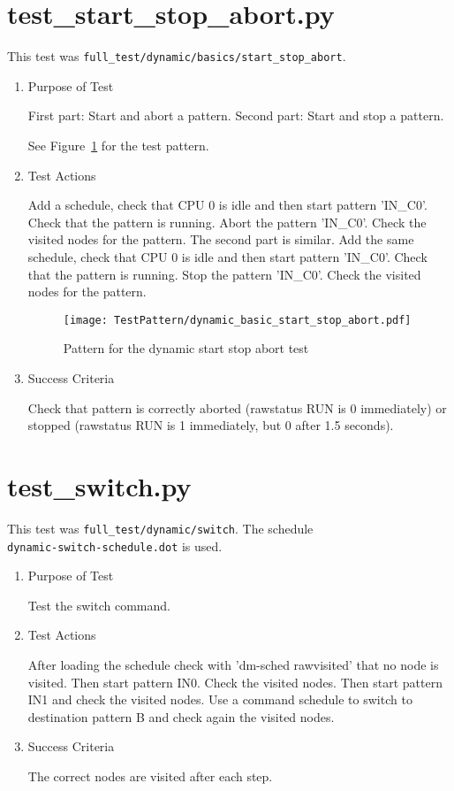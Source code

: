 \documentclass[12pt,a4paper]{report}
\begin{document}
\section{test\_start\_stop\_abort.py}
This test was \texttt{full\_test/dynamic/basics/start\_stop\_abort}.
\begin{enumerate}
  \item Purpose of Test

    First part: Start and abort a pattern. Second part: Start and stop a pattern.

  See Figure~\ref{fig:Pattern_for_the_dynamic_start_stop_abort_test} for the test pattern.
  \item Test Actions

    Add a schedule, check that CPU 0 is idle and then start pattern 'IN\_C0'. Check that the pattern is running.
    Abort the pattern 'IN\_C0'. Check the visited nodes for the pattern. The second part is similar.
    Add the same schedule, check that CPU 0 is idle and then start pattern 'IN\_C0'. Check that the pattern is running.
    Stop the pattern 'IN\_C0'. Check the visited nodes for the pattern.
    \begin{figure}
        \centering
        \texttt{[image: TestPattern/dynamic\_basic\_start\_stop\_abort.pdf]}
        \caption{Pattern for the dynamic start stop abort test}
        \label{fig:Pattern_for_the_dynamic_start_stop_abort_test}
    \end{figure}
  \item Success Criteria

  Check that pattern is correctly aborted (rawstatus RUN is 0 immediately) or
  stopped (rawstatus RUN is 1 immediately, but 0 after 1.5 seconds).
\end{enumerate}

\section{test\_switch.py}
This test was \texttt{full\_test/dynamic/switch}. The schedule \\
\texttt{dynamic-switch-schedule.dot} is used.
\begin{enumerate}
  \item Purpose of Test

  Test the switch command.
  \item Test Actions

  After loading the schedule check with 'dm-sched rawvisited' that no node
  is visited. Then start pattern IN0. Check the visited nodes. Then start
  pattern IN1 and check the visited nodes. Use a command schedule to
  switch to destination pattern B and check again the visited nodes.
  \item Success Criteria

  The correct nodes are visited after each step.
\end{enumerate}
\end{document}
